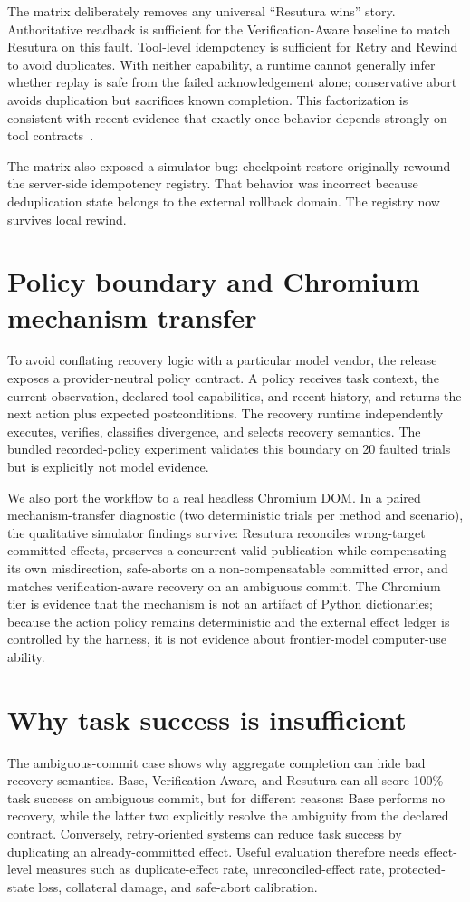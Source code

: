 \documentclass[10pt]{article}
\begin{document}
The matrix deliberately removes any universal ``Resutura wins'' story. Authoritative readback is sufficient for the Verification-Aware baseline to match Resutura on this fault. Tool-level idempotency is sufficient for Retry and Rewind to avoid duplicates. With neither capability, a runtime cannot generally infer whether replay is safe from the failed acknowledgement alone; conservative abort avoids duplication but sacrifices known completion. This factorization is consistent with recent evidence that exactly-once behavior depends strongly on tool contracts~\cite{verified,limbo}.

The matrix also exposed a simulator bug: checkpoint restore originally rewound the server-side idempotency registry. That behavior was incorrect because deduplication state belongs to the external rollback domain. The registry now survives local rewind.

\section{Policy boundary and Chromium mechanism transfer}
To avoid conflating recovery logic with a particular model vendor, the release exposes a provider-neutral policy contract. A policy receives task context, the current observation, declared tool capabilities, and recent history, and returns the next action plus expected postconditions. The recovery runtime independently executes, verifies, classifies divergence, and selects recovery semantics. The bundled recorded-policy experiment validates this boundary on 20 faulted trials but is explicitly not model evidence.

We also port the workflow to a real headless Chromium DOM. In a paired mechanism-transfer diagnostic (two deterministic trials per method and scenario), the qualitative simulator findings survive: Resutura reconciles wrong-target committed effects, preserves a concurrent valid publication while compensating its own misdirection, safe-aborts on a non-compensatable committed error, and matches verification-aware recovery on an ambiguous commit. The Chromium tier is evidence that the mechanism is not an artifact of Python dictionaries; because the action policy remains deterministic and the external effect ledger is controlled by the harness, it is not evidence about frontier-model computer-use ability.

\section{Why task success is insufficient}
The ambiguous-commit case shows why aggregate completion can hide bad recovery semantics. Base, Verification-Aware, and Resutura can all score 100\% task success on ambiguous commit, but for different reasons: Base performs no recovery, while the latter two explicitly resolve the ambiguity from the declared contract. Conversely, retry-oriented systems can reduce task success by duplicating an already-committed effect. Useful evaluation therefore needs effect-level measures such as duplicate-effect rate, unreconciled-effect rate, protected-state loss, collateral damage, and safe-abort calibration.
\end{document}
